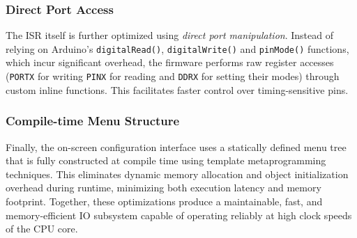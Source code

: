\subsubsection{Direct Port Access} The ISR itself is further optimized using \emph{direct port manipulation}. Instead of relying on Arduino’s \texttt{digitalRead()}, \texttt{digitalWrite()} and \texttt{pinMode()} functions, which incur significant overhead, the firmware performs raw register accesses (\texttt{PORTX} for writing \texttt{PINX} for reading and \texttt{DDRX} for setting their modes) through custom inline functions. This facilitates faster control over timing-sensitive pins.

\subsubsection{Compile-time Menu Structure} Finally, the on-screen configuration interface uses a statically defined menu tree that is fully constructed at compile time using template metaprogramming techniques. This eliminates dynamic memory allocation and object initialization overhead during runtime, minimizing both execution latency and memory footprint. Together, these optimizations produce a maintainable, fast, and memory-efficient IO subsystem capable of operating reliably at high clock speeds of the CPU core.
\vfill

